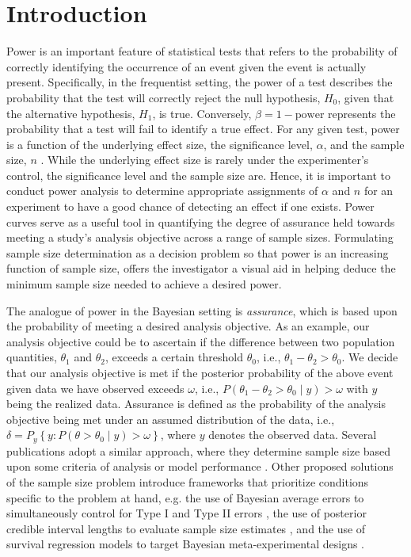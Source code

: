 \section{Introduction}\label{introduction}

Power is an important feature of statistical tests that refers to the probability of correctly identifying the occurrence of an event given the event is actually present. %
Specifically, in the frequentist setting, the power of a test describes the probability that the test will correctly reject the null hypothesis, $H_0$, given that the alternative hypothesis, $H_1$,  is true. Conversely, $\beta = 1 - \text{power}$ represents the probability that a test will fail to identify a true effect. For any given test, power is a function of the underlying effect size, the significance level, $\alpha$, and the sample size, $n$ . While the underlying effect size is rarely under the experimenter's control, the significance level and the sample size are. Hence, it is important to conduct power analysis to determine appropriate assignments of $\alpha$ and $n$  for an experiment to have a good chance of detecting an effect if one exists. 
Power curves serve as a useful tool in quantifying the degree of assurance held towards meeting a study's analysis objective across a range of sample sizes. Formulating sample size determination as a decision problem so that power is an increasing function of sample size, offers the investigator a visual aid in helping deduce the minimum sample size needed to achieve a desired power. 

The analogue of power in the Bayesian setting is \emph{assurance}, which is based upon the probability of meeting a desired analysis objective. As an example, our analysis objective could be to ascertain if the difference between two population quantities, $\theta_1$ and $\theta_2$, exceeds a certain threshold $\theta_0$, i.e., $\theta_1 - \theta_2 > \theta_0$. We decide that our analysis objective is met if the posterior probability of the above event given data we have observed exceeds $\omega$, i.e., $P(\theta_1 - \theta_2 > \theta_0 \mid y) > \omega$ with $y$ being the realized data. Assurance is defined as the probability of the analysis objective being met under an assumed distribution of the data, i.e., $\delta = P_{y}\left\{y: P\left(\theta > \theta_0 \mid {y}\right) > \omega \right\}$, where ${y}$ denotes the observed data. Several publications adopt a similar approach, where they determine sample size based upon some criteria of analysis or model performance \citep{rahme, wang, ohagan}. Other proposed solutions of the sample size problem introduce frameworks that prioritize conditions specific to the problem at hand, e.g. the use of Bayesian average errors to simultaneously control for Type I and Type II errors \citep{reyes}, the use of posterior credible interval lengths to evaluate
sample size estimates \citep{joseph}, and the use of survival regression models to target
Bayesian meta-experimental designs \citep{reyes}.

